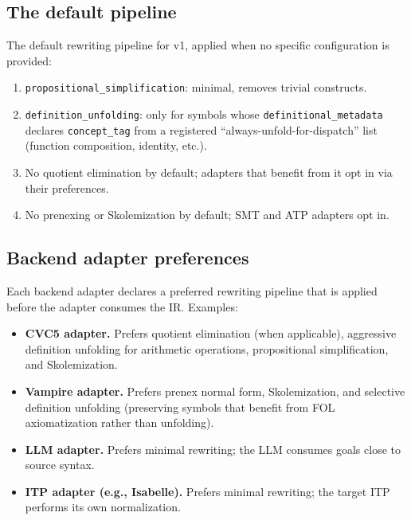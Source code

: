 \documentclass[11pt,letterpaper]{article}
\theoremstyle{definition}
\theoremstyle{remark}
\begin{document}
\subsection{The default pipeline}

The default rewriting pipeline for v1, applied when no specific
configuration is provided:

\begin{enumerate}[leftmargin=2em]
  \item \texttt{propositional\_simplification}: minimal, removes trivial
        constructs.
  \item \texttt{definition\_unfolding}: only for symbols whose
        \texttt{definitional\_metadata} declares \texttt{concept\_tag} from
        a registered ``always-unfold-for-dispatch'' list (function
        composition, identity, etc.).
  \item No quotient elimination by default; adapters that benefit from it
        opt in via their preferences.
  \item No prenexing or Skolemization by default; SMT and ATP adapters
        opt in.
\end{enumerate}

\subsection{Backend adapter preferences}

Each backend adapter declares a preferred rewriting pipeline that is
applied before the adapter consumes the IR. Examples:

\begin{itemize}[leftmargin=2em]
  \item \textbf{CVC5 adapter.} Prefers quotient elimination (when
        applicable), aggressive definition unfolding for arithmetic
        operations, propositional simplification, and Skolemization.
  \item \textbf{Vampire adapter.} Prefers prenex normal form,
        Skolemization, and selective definition unfolding (preserving
        symbols that benefit from FOL axiomatization rather than
        unfolding).
  \item \textbf{LLM adapter.} Prefers minimal rewriting; the LLM
        consumes goals close to source syntax.
  \item \textbf{ITP adapter (e.g., Isabelle).} Prefers minimal rewriting;
        the target ITP performs its own normalization.
\end{itemize}
\end{document}
